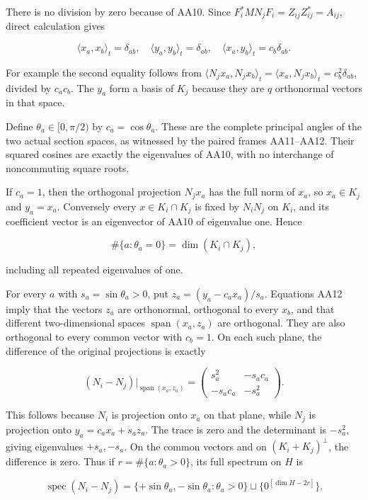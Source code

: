 \documentclass{article}
\begin{document}
There is no division by zero because of AA10. Since \(F_i^*MN_jF_i=Z_{ij}Z_{ij}^*=A_{ij}\), direct calculation gives

\[
\langle x_a,x_b\rangle_t=\delta_{ab},\quad
\langle y_a,y_b\rangle_t=\delta_{ab},\quad
\langle x_a,y_b\rangle_t=c_b\delta_{ab}.
\tag{AA12}
\]

For example the second equality follows from \(\langle N_jx_a,N_jx_b\rangle_t
=\langle x_a,N_jx_b\rangle_t=c_b^2\delta_{ab}\), divided by \(c_ac_b\). The \(y_a\) form a basis of \(K_j\) because they are \(q\) orthonormal vectors in that space.

Define \(\theta_a\in[0,\pi/2)\) by \(c_a=\cos\theta_a\). These are the complete principal angles of the two actual section spaces, as witnessed by the paired frames AA11--AA12. Their squared cosines are exactly the eigenvalues of AA10, with no interchange of noncommuting square roots.

If \(c_a=1\), then the orthogonal projection \(N_jx_a\) has the full norm of \(x_a\), so \(x_a\in K_j\) and \(y_a=x_a\). Conversely every \(x\in K_i\cap K_j\) is fixed by \(N_iN_j\) on \(K_i\), and its coefficient vector is an eigenvector of AA10 of eigenvalue one. Hence

\[
\#\{a:\theta_a=0\}=\dim(K_i\cap K_j),
\tag{AA13}
\]

including all repeated eigenvalues of one.

For every \(a\) with \(s_a=\sin\theta_a>0\), put \(z_a=(y_a-c_ax_a)/s_a\). Equations AA12 imply that the vectors \(z_a\) are orthonormal, orthogonal to every \(x_b\), and that different two-dimensional spaces \(\operatorname{span}(x_a,z_a)\) are orthogonal. They are also orthogonal to every common vector with \(c_b=1\). On each such plane, the difference of the original projections is exactly

\[
(N_i-N_j)|_{\operatorname{span}(x_a,z_a)}
=\begin{pmatrix}s_a^2&-s_ac_a\\-s_ac_a&-s_a^2\end{pmatrix}.
\tag{AA14}
\]

This follows because \(N_i\) is projection onto \(x_a\) on that plane, while \(N_j\) is projection onto \(y_a=c_ax_a+s_az_a\). The trace is zero and the determinant is \(-s_a^2\), giving eigenvalues \(+s_a,-s_a\). On the common vectors and on \((K_i+K_j)^\perp\), the difference is zero. Thus if \(r=\#\{a:\theta_a>0\}\), its full spectrum on \(H\) is

\[
\operatorname{spec}(N_i-N_j)
=\{+\sin\theta_a,-\sin\theta_a:\theta_a>0\}
 \sqcup\{0^{[\dim H-2r]}\}.
\tag{AA15}
\]
\end{document}
